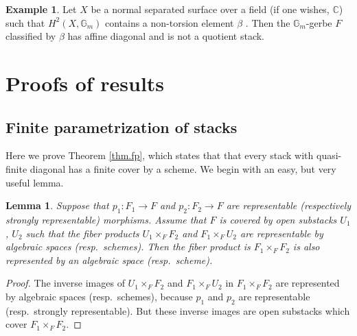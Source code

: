 \documentclass[12pt]{amsart}
\newcommand{\G}{{\mathbb G}}
\newcommand{\C}{{\mathbb C}}
\theoremstyle{plain}
\newtheorem  {lemma}[thm] {Lemma}
\theoremstyle{definition}
\newtheorem  {exml} [thm] {Example}
\theoremstyle{remark}
\begin{document}
\begin{exml}
Let $X$ be a normal separated surface over a field (if one wishes, $\C$)
such that $H^2(X,\G_m)$ contains a non-torsion element $\beta$
\cite[II.1.11.b]{Gr}.
Then the $\G_m$-gerbe $F$ classified by $\beta$ has affine diagonal
and is not a quotient stack.
\end{exml}

\section{Proofs of results} \label{s.proofs}

\subsection{Finite parametrization of stacks}
Here we prove Theorem \ref{thm.fp}, which states that
that every stack with quasi-finite diagonal has a finite cover by a scheme.
We begin with an easy, but very useful lemma.

\begin{lemma} \label{l.shtrick}
Suppose that $p_1\colon F_1 \rightarrow F$ and $p_2\colon F_2 \rightarrow F$
are representable (respectively strongly representable) morphisms.
Assume that $F$ is covered by open substacks $U_1$, $U_2$
such that the fiber products $U_1 \times_F F_2$ and $F_1 \times_F U_2$ are 
representable by algebraic spaces (resp.\ schemes).
Then the 
fiber product is $F_1 \times_F F_2$
is also represented by an algebraic space (resp.\ scheme).
\end{lemma}


\begin{proof}
The inverse images of $U_1 \times_F F_2$ and $F_1 \times_F U_2$ in $F_1
\times_F F_2$ are represented by algebraic spaces (resp.\ schemes),
because $p_1$ and $p_2$ are representable (resp.\ strongly representable).
But these inverse images are open substacks which cover $F_1 \times_F F_2$.
\end{proof}
\end{document}
